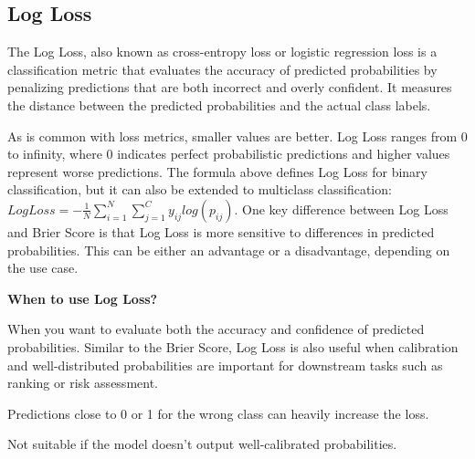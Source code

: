 \subsection{Log Loss}

The Log Loss, also known as cross-entropy loss or logistic regression loss is a classification metric that evaluates the accuracy of predicted probabilities by
penalizing predictions that are both incorrect and overly confident. It measures the distance between the predicted probabilities and the actual class labels.

\begin{center}
\end{center}

As is common with loss metrics, smaller values are better. Log Loss ranges from 0 to infinity, where 0 indicates perfect probabilistic predictions and higher values
represent worse predictions. The formula above defines Log Loss for binary classification, but it can also be extended to multiclass classification:  
$Log Loss = -\frac{1}{N} \sum_{i=1}^{N} \sum_{j=1}^{C} y_{ij} log(p_{ij})$.
One key difference between Log Loss and Brier Score is that Log Loss is more sensitive to differences in predicted probabilities. This can be either an advantage or a
disadvantage, depending on the use case.


\textbf{When to use Log Loss?}

When you want to evaluate both the accuracy and confidence of predicted probabilities. Similar to the Brier Score, Log Loss is also useful when calibration
and well-distributed probabilities are important for downstream tasks such as ranking or risk assessment.

{
    \item Predictions close to 0 or 1 for the wrong class can heavily increase the loss.
    \item Not suitable if the model doesn't output well-calibrated probabilities.
}

